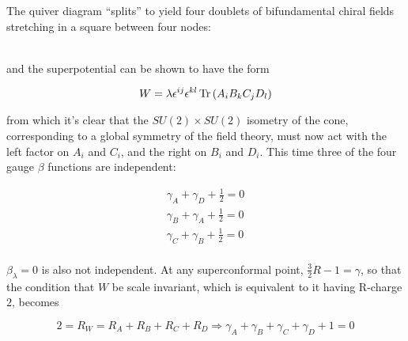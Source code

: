 The quiver diagram ``splits'' to yield four doublets of bifundamental chiral fields stretching in a square between four nodes:\\


\begin{figure}[!h]
	\centering
{}
\end{figure}

\\

and the superpotential can be shown to have the form

\begin{equation}
	W = \lambda \epsilon^{ij} \epsilon^{kl} \operatorname{Tr}\left( A_i B_k C_j D_l \right)
	\label{}
\end{equation}

from which it's clear that the $SU(2) \times SU(2)$ isometry of the cone, corresponding to a global symmetry of the field theory, must now act with the left factor on $A_i$ and $C_i$, and the right on $B_i$ and $D_i$. This time three of the four gauge $\beta$ functions are independent:

\begin{align}
	\gamma_A + \gamma_D + \frac{1}{2} = 0 \\
	\gamma_B + \gamma_A + \frac{1}{2} = 0 \\
	\gamma_C + \gamma_B + \frac{1}{2} = 0 \\
\end{align}

$\beta_\lambda = 0$ is also not independent. At any superconformal point, $\frac{3}{2}R - 1 = \gamma$, so that the condition that $W$ be scale invariant, which is equivalent to it having R-charge $2$, becomes

\begin{equation}
	2 = R_W = R_A + R_B + R_C + R_D \Rightarrow \gamma_A + \gamma_B + \gamma_C + \gamma_D + 1 = 0
	\label{}
\end{equation}

